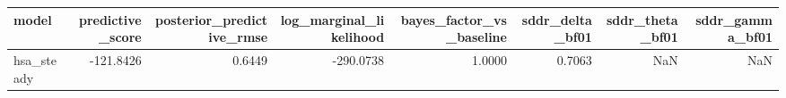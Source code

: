\begin{tabular}{lrrrrrrr}
\toprule
model & predictive\_score & posterior\_predictive\_rmse & log\_marginal\_likelihood & bayes\_factor\_vs\_baseline & sddr\_delta\_bf01 & sddr\_theta\_bf01 & sddr\_gamma\_bf01 \\
\midrule
hsa\_steady & -121.8426 & 0.6449 & -290.0738 & 1.0000 & 0.7063 & NaN & NaN \\
\bottomrule
\end{tabular}
